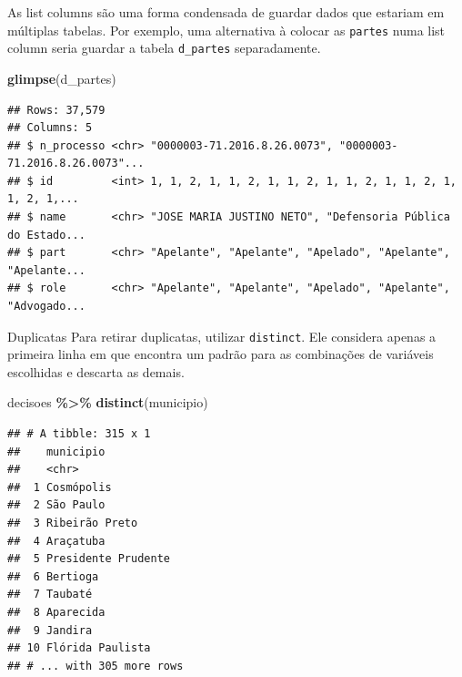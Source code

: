 \documentclass[
  9pt,
  ignorenonframetext,
]{beamer}
\newenvironment{Shaded}{\begin{snugshade}}{\end{snugshade}}
\newcommand{\KeywordTok}[1]{\textcolor[rgb]{0.13,0.29,0.53}{\textbf{#1}}}
\newcommand{\NormalTok}[1]{#1}
\newcommand{\OperatorTok}[1]{\textcolor[rgb]{0.81,0.36,0.00}{\textbf{#1}}}
\newcommand{\StringTok}[1]{\textcolor[rgb]{0.31,0.60,0.02}{#1}}
\begin{document}
\begin{frame}[fragile]{}
\protect\hypertarget{section-4}{}
As list columns são uma forma condensada de guardar dados que estariam
em múltiplas tabelas. Por exemplo, uma alternativa à colocar as
\texttt{partes} numa list column seria guardar a tabela
\texttt{d\_partes} separadamente.

\begin{Shaded}
\begin{Highlighting}[]
\KeywordTok{glimpse}\NormalTok{(d\_partes)}
\end{Highlighting}
\end{Shaded}

\begin{verbatim}
## Rows: 37,579
## Columns: 5
## $ n_processo <chr> "0000003-71.2016.8.26.0073", "0000003-71.2016.8.26.0073"...
## $ id         <int> 1, 1, 2, 1, 1, 2, 1, 1, 2, 1, 1, 2, 1, 1, 2, 1, 1, 2, 1,...
## $ name       <chr> "JOSE MARIA JUSTINO NETO", "Defensoria Pública do Estado...
## $ part       <chr> "Apelante", "Apelante", "Apelado", "Apelante", "Apelante...
## $ role       <chr> "Apelante", "Apelante", "Apelado", "Apelante", "Advogado...
\end{verbatim}
\end{frame}

\begin{frame}[fragile]{Duplicatas}
\protect\hypertarget{duplicatas}{}
Para retirar duplicatas, utilizar \texttt{distinct}. Ele considera
apenas a primeira linha em que encontra um padrão para as combinações de
variáveis escolhidas e descarta as demais.

\begin{Shaded}
\begin{Highlighting}[]
\NormalTok{decisoes }\OperatorTok{\%\textgreater{}\%}\StringTok{ }
\StringTok{  }\KeywordTok{distinct}\NormalTok{(municipio)}
\end{Highlighting}
\end{Shaded}

\begin{verbatim}
## # A tibble: 315 x 1
##    municipio          
##    <chr>              
##  1 Cosmópolis         
##  2 São Paulo          
##  3 Ribeirão Preto     
##  4 Araçatuba          
##  5 Presidente Prudente
##  6 Bertioga           
##  7 Taubaté            
##  8 Aparecida          
##  9 Jandira            
## 10 Flórida Paulista   
## # ... with 305 more rows
\end{verbatim}
\end{frame}
\end{document}
